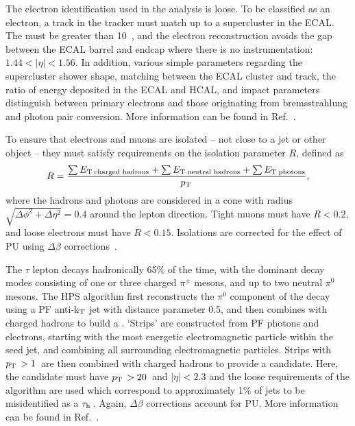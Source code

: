 The electron identification used in the analysis is loose. To be classified as an electron, a track in the tracker must match up to a supercluster in the \ac{ECAL}. 
The \pt must be greater than 10~\GeV, 
and the electron reconstruction avoids the gap between the \ac{ECAL} barrel and endcap where there is no instrumentation: 
$1.44< |\eta| < 1.56 $. 
In addition, various simple parameters regarding the supercluster shower shape, matching between the \ac{ECAL} cluster and track, 
the ratio of energy deposited in the \ac{ECAL} and \ac{HCAL}, and impact parameters distinguish between primary electrons and those originating from bremsstrahlung and photon pair conversion. More information can be found in Ref.~\cite{CMS:elecReco}.

To ensure that electrons and muons are isolated -- not close to a jet or other object -- they must satisfy requirements on the isolation parameter $R$, defined as
\begin{equation}
R = \frac{\sum{\ensuremath{E_{\text{T}}}\,_{\text{charged hadrons}}}+ \sum{\ensuremath{E_{\text{T}}}\,_{\text{neutral hadrons}}}+ \sum{\ensuremath{E_{\text{T}}}\,_{\text{photons}}} }{p_{\text{T}}\,},
\end{equation} 
where the hadrons and photons are considered in a cone with radius $\sqrt{\Delta \phi ^{2} + \Delta \eta ^{2}}=0.4$ around the lepton direction.
Tight muons must have $R<0.2$, and loose electrons must have $R<0.15$.
Isolations are corrected for the effect of \ac{PU} using $\Delta\beta$ corrections~\cite{deltabeta_htautau7tev}.


The $\tau$ lepton decays hadronically 65\% of the time, with the dominant decay modes consisting of one or three charged $\pi^{\pm}$ mesons, and up to two neutral $\pi^{0}$ mesons.
The \ac{HPS} algorithm first reconstructs the $\pi^{0}$ component of the \tauh decay using a \ac{PF} anti-k$_{\rm T}$ jet with distance parameter 0.5, and then combines with charged hadrons to build a \tauh. 
`Strips' are constructed from \ac{PF} photons and electrons, starting with the most energetic electromagnetic particle within the seed jet, and combining all surrounding electromagnetic particles.
Strips with $p_{\text{T}}\, > 1$~\GeV are then combined with charged hadrons to provide a \tauh candidate. 
Here, the candidate must have $p_{\text{T}}\, > 20$~\GeV and $|\eta| < 2.3$ and the loose requirements of the algorithm are used which correspond to approximately 1\% of jets to be misidentified as a $\tau_\mathrm{h}\,$.
Again, $\Delta\beta$ corrections account for \ac{PU}. 
More information can be found in Ref.~\cite{bib:HPStaus}. 



